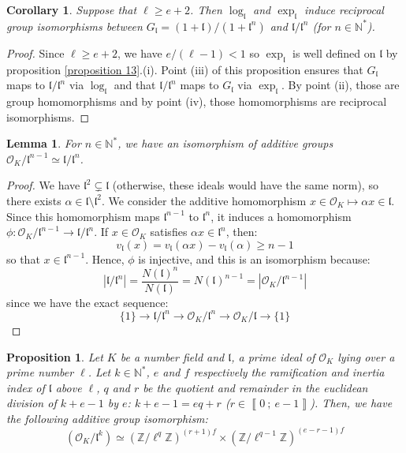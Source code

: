 \documentclass[a4paper,10pt]{report}
\theoremstyle{definition}
\theoremstyle{plain}
\newtheorem{proposition}[definition]{Proposition}
\newtheorem{lemma}[definition]{Lemma}
\newtheorem{corollary}[definition]{Corollary}
\theoremstyle{definition}
\newcommand{\N}{\mathbb{N}}
\newcommand{\Z}{\mathbb{Z}}
\newcommand{\mO}{\mathcal{O}}
\renewcommand{\i}[2]{\left\llbracket #1~;~#2\right\rrbracket}
\renewcommand{\(}{\left(}
\renewcommand{\)}{\right)}
\newcommand{\mf}[1]{\mathfrak{#1}}
\begin{document}
\begin{corollary}
Suppose that $\ell\geq e+2$. Then $\log_{\mf{l}}$ and $\exp_{\mf{l}}$ induce reciprocal group isomorphisms between $G_{\mf{l}}=(1+\mf{l})/(1+\mf{l}^n)$ and $\mf{l}/\mf{l}^n$ (for $n\in\N^*$).
\end{corollary}

\begin{proof}
Since $\ell\geq e+2$, we have $e/(\ell-1)<1$ so $\exp_{\mf{l}}$ is well defined on $\mf{l}$ by proposition \ref{proposition 13}.(i). Point (iii) of this proposition ensures that $G_{\mf{l}}$ maps to $\mf{l}/\mf{l}^n$ via $\log_{\mf{l}}$ and that $\mf{l}/\mf{l}^n$ maps to $G_{\mf{l}}$ via $\exp_{\mf{l}}$. By point (ii), those are group homomorphisms and by point (iv), those homomorphisms are reciprocal isomorphisms.
\end{proof}

\begin{lemma}\label{lemma 17}
For $n\in\N^*$, we have an isomorphism of additive groups $\mO_K/\mf{l}^{n-1}\simeq \mf{l}/\mf{l}^{n}$.
\end{lemma}

\begin{proof}
We have $\mf{l}^2\subsetneq \mf{l}$ (otherwise, these ideals would have the same norm), so there exists $\alpha\in\mf{l}\setminus\mf{l}^2$. We consider the additive homomorphism $x\in\mO_K\longmapsto \alpha x\in\mf{l}$. Since this homomorphism maps $\mf{l}^{n-1}$ to $\mf{l}^n$, it induces a homomorphism $\phi:\mO_K/\mf{l}^{n-1}\longrightarrow \mf{l}/\mf{l}^{n}$. If $x\in\mO_K$ satisfies $\alpha x\in\mf{l}^n$, then:
\[v_{\mf{l}}(x)=v_{\mf{l}}(\alpha x)-v_{\mf{l}}(\alpha)\geq n-1\]
so that $x\in \mf{l}^{n-1}$. Hence, $\phi$ is injective, and this is an isomorphism because:
\[|\mf{l}/\mf{l}^n|=\frac{N(\mf{l})^n}{N(\mf{l})}=N(\mf{l})^{n-1}=|\mO_K/\mf{l}^{n-1}|\]
since we have the exact sequence:
\[\{1\}\longrightarrow \mf{l}/\mf{l}^n\longrightarrow \mO_K/\mf{l}^n\longrightarrow\mO_K/\mf{l}\longrightarrow\{1\}\]
\end{proof}

\begin{proposition}\label{proposition 14}
Let  $K$ be a number field and $\mf{l}$, a prime ideal of $\mO_K$ lying over a prime number $\ell$. Let $k\in\N^*$, $e$ and $f$ respectively the ramification and inertia index of $\mf{l}$ above $\ell$, $q$ and $r$ be the quotient and remainder in the euclidean division of $k+e-1$ by $e$: $k+e-1=eq+r$ ($r\in\i{0}{e-1}$). Then, we have the following additive group isomorphism:
\[(\mO_K/\mf{l}^k)\simeq (\Z/\ell^q\Z)^{(r+1)f}\times(\Z/\ell^{q-1}\Z)^{(e-r-1)f}\]
\end{proposition}
\end{document}
